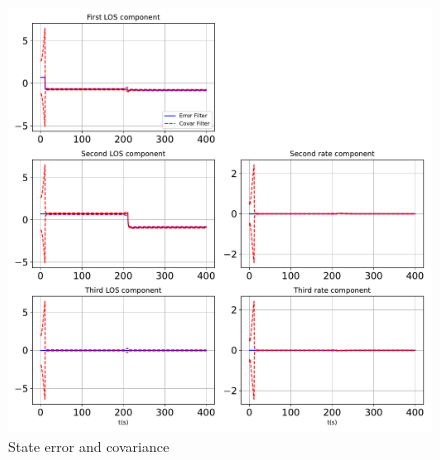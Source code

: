 \begin{figure}[htbp]\centerline{\includegraphics[height=0.9\textwidth, keepaspectratio]{AutoTeX/StatesPlotupdate}}\caption{State error and covariance}\label{fig:StatesPlotupdate}\end{figure}